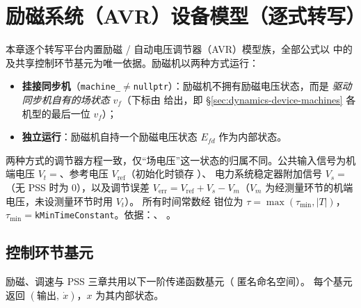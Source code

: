 \section{励磁系统（AVR）设备模型（逐式转写）}
\label{sec:dynamics-device-exciters}

本章逐个转写平台内置励磁 / 自动电压调节器（AVR）模型族，全部公式以
 中的
 及共享控制环节基元为唯一依据。励磁机以两种方式运行：

\begin{itemize}
  \item \textbf{挂接同步机}（\texttt{machine\_}$\ne$\texttt{nullptr}）：励磁机不拥有励磁电压状态，而是
        \emph{驱动同步机自有的场状态} $v_f$（下标由  给出，即
        \S\ref{sec:dynamics-device-machines} 各机型的最后一位 $v_f$）；
  \item \textbf{独立运行}：励磁机自持一个励磁电压状态 $E_{fd}$ 作为内部状态。
\end{itemize}

两种方式的调节器方程一致，仅“场电压”这一状态的归属不同。公共输入信号为机端电压
$V_t=$、参考电压 $V_{\mathrm{ref}}$（初始化时锁存 ）、
电力系统稳定器附加信号 $V_s=$（无 PSS 时为 0），以及调节误差
$V_{\mathrm{err}}=V_{\mathrm{ref}}+V_s-V_m$（$V_m$ 为经测量环节的机端电压，未设测量环节时用 $V_t$）。
所有时间常数经  钳位为 $\tau=\max(\tau_{\min},|T|)$，
$\tau_{\min}=$\texttt{kMinTimeConstant}。依据：、
。

\subsection{控制环节基元}
\label{sec:dynamics-control-primitives}
励磁、调速与 PSS 三章共用以下一阶传递函数基元（ 匿名命名空间）。
每个基元返回 $(\text{输出},\ \dot x)$，$x$ 为其内部状态。

